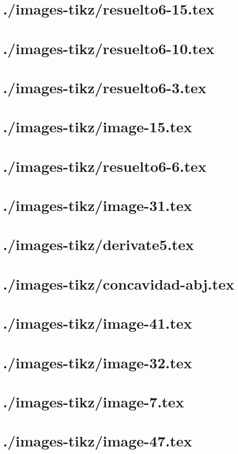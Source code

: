\documentclass[]{article}
\begin{document}
\section{./images-tikz/resuelto6-15.tex} 
\section{./images-tikz/resuelto6-10.tex} 
\section{./images-tikz/resuelto6-3.tex} 
\section{./images-tikz/image-15.tex} 
\section{./images-tikz/resuelto6-6.tex} 
\section{./images-tikz/image-31.tex} 
\section{./images-tikz/derivate5.tex} 
\section{./images-tikz/concavidad-abj.tex} 
\section{./images-tikz/image-41.tex} 
\section{./images-tikz/image-32.tex} 
\section{./images-tikz/image-7.tex} 
\section{./images-tikz/image-47.tex} 
\end{document}

